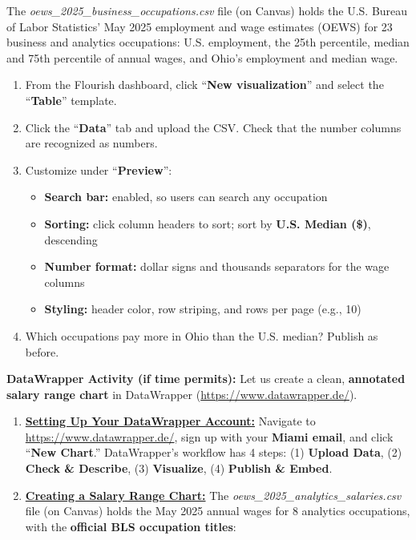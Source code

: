 \documentclass[letterpaper,addpoints, 11pt]{exam}
\begin{document}
\begin{questions}
\begin{enumerate}[label=(\Alph*)]
	The \textit{oews\_2025\_business\_occupations.csv} file (on Canvas) holds the U.S. Bureau of Labor Statistics' May 2025 employment and wage estimates (OEWS) for 23 business and analytics occupations: U.S. employment, the 25th percentile, median and 75th percentile of annual wages, and Ohio's employment and median wage.
	\begin{enumerate}[nosep, label=\arabic*.]
		\item From the Flourish dashboard, click ``\textbf{New visualization}'' and select the ``\textbf{Table}'' template.
		\item Click the ``\textbf{Data}'' tab and upload the CSV. Check that the number columns are recognized as numbers.
		\item Customize under ``\textbf{Preview}'':
		\begin{itemize}[nosep]
			\item \textbf{Search bar:} enabled, so users can search any occupation
			\item \textbf{Sorting:} click column headers to sort; sort by \textbf{U.S. Median (\$)}, descending
			\item \textbf{Number format:} dollar signs and thousands separators for the wage columns
			\item \textbf{Styling:} header color, row striping, and rows per page (e.g., 10)
		\end{itemize}
		\item Which occupations pay more in Ohio than the U.S. median? Publish as before.
	\end{enumerate}
\end{enumerate}

\newpage

\question[0] \textbf{DataWrapper Activity (if time permits):} Let us create a clean, \textbf{annotated salary range chart} in DataWrapper (\url{https://www.datawrapper.de/}).

\begin{enumerate}[label=(\Alph*)]
	\item \underline{\textbf{Setting Up Your DataWrapper Account:}} Navigate to \url{https://www.datawrapper.de/}, sign up with your \textbf{Miami email}, and click ``\textbf{New Chart}.'' DataWrapper's workflow has 4 steps: (1) \textbf{Upload Data}, (2) \textbf{Check \& Describe}, (3) \textbf{Visualize}, (4) \textbf{Publish \& Embed}.

	\bigskip
	\item \underline{\textbf{Creating a Salary Range Chart:}} The \textit{oews\_2025\_analytics\_salaries.csv} file (on Canvas) holds the May 2025 annual wages for 8 analytics occupations, with the \textbf{official BLS occupation titles}:


\end{enumerate}
\end{questions}
\end{document}
